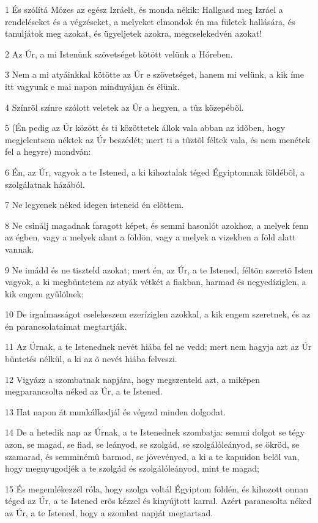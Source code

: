 \par 1 És szólítá Mózes az egész Izráelt, és monda nékik: Hallgasd meg Izráel a rendeléseket és a végzéseket, a melyeket elmondok én ma fületek hallására, és tanuljátok meg azokat, és ügyeljetek azokra, megcselekedvén azokat!
\par 2 Az Úr, a mi Istenünk szövetséget kötött velünk a Hóreben.
\par 3 Nem a mi atyáinkkal kötötte az Úr e szövetséget, hanem mi velünk, a kik íme itt vagyunk e mai napon mindnyájan és élünk.
\par 4 Színrõl színre szólott veletek az Úr a hegyen, a tûz közepébõl.
\par 5 (Én pedig az Úr között és ti közöttetek állok vala abban az idõben, hogy megjelentsem néktek az Úr beszédét; mert ti a tûztõl féltek vala, és nem menétek fel a hegyre) mondván:
\par 6 Én, az Úr, vagyok a te Istened, a ki kihoztalak téged Égyiptomnak földébõl, a szolgálatnak házából.
\par 7 Ne legyenek néked idegen isteneid én elõttem.
\par 8 Ne csinálj magadnak faragott képet, és semmi hasonlót azokhoz, a melyek fenn az égben, vagy a melyek alant a földön, vagy a melyek a vizekben a föld alatt vannak.
\par 9 Ne imádd és ne tiszteld azokat; mert én, az Úr, a te Istened, féltõn szeretõ Isten vagyok, a ki megbüntetem az atyák vétkét a fiakban, harmad és negyedíziglen, a kik engem gyûlölnek;
\par 10 De irgalmasságot cselekeszem ezeríziglen azokkal, a kik engem szeretnek, és az én parancsolataimat megtartják.
\par 11 Az Úrnak, a te Istenednek nevét hiába fel ne vedd; mert nem hagyja azt az Úr büntetés nélkül, a ki az õ nevét hiába felveszi.
\par 12 Vigyázz a szombatnak napjára, hogy megszenteld azt, a miképen megparancsolta  néked az Úr, a te Istened.
\par 13 Hat napon át munkálkodjál és végezd minden dolgodat.
\par 14 De a hetedik nap az Úrnak, a te Istenednek szombatja: semmi dolgot se tégy azon, se magad, se fiad, se leányod, se szolgád, se szolgálóleányod, se ökröd, se szamarad, és semminémû barmod, se jövevényed, a ki a te kapuidon belõl van, hogy megnyugodjék a te szolgád és szolgálóleányod, mint te magad;
\par 15 És megemlékezzél róla, hogy szolga voltál Égyiptom földén, és kihozott onnan téged az Úr, a te Istened erõs kézzel és kinyújtott karral. Azért parancsolta néked az Úr, a te Istened, hogy a szombat napját megtartsad.
